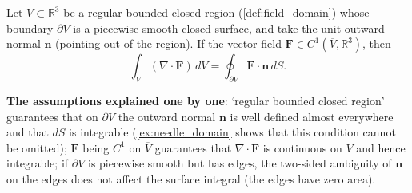 \begin{theorem}\label{thm:divergence}
Let $V \subset \mathbb{R}^3$ be a regular bounded closed region (\cref{def:field_domain}) whose boundary $\partial V$ is a piecewise smooth closed surface, and take the unit outward normal $\mathbf{n}$ (pointing out of the region). If the vector field $\mathbf{F} \in C^1(\overline{V}, \mathbb{R}^3)$, then
\[
\int_V (\nabla \cdot \mathbf{F}) \, dV = \oint_{\partial V} \mathbf{F} \cdot \mathbf{n} \, dS.
\]

\textbf{The assumptions explained one by one}: `regular bounded closed region' guarantees that on $\partial V$ the outward normal $\mathbf n$ is well defined almost everywhere and that $dS$ is integrable (\cref{ex:needle_domain} shows that this condition cannot be omitted); $\mathbf F$ being $C^1$ on $\overline V$ guarantees that $\nabla\cdot\mathbf F$ is continuous on $V$ and hence integrable; if $\partial V$ is piecewise smooth but has edges, the two-sided ambiguity of $\mathbf n$ on the edges does not affect the surface integral (the edges have zero area).
\end{theorem}

